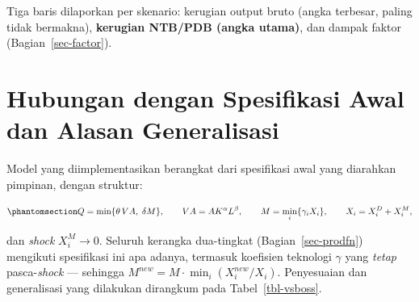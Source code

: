 \documentclass[
  manuscript=article,
  layout=publish,
  year=2026,
  volume=1,
]{den}
\begin{document}
Tiga baris dilaporkan per skenario: kerugian output bruto (angka
terbesar, paling tidak bermakna), \textbf{kerugian NTB/PDB (angka
utama)}, dan dampak faktor (Bagian~\ref{sec-factor}).

\section{Hubungan dengan Spesifikasi Awal dan Alasan
Generalisasi}\label{sec-boss}

Model yang diimplementasikan berangkat dari spesifikasi awal yang
diarahkan pimpinan, dengan struktur:

\begin{equation}\phantomsection\label{eq-bossspec}{
Q = \min\{\theta\,VA,\; \delta M\}, \qquad
VA = AK^{\alpha}L^{\beta}, \qquad
M = \min_i\{\gamma_i X_i\}, \qquad
X_i = X_i^D + X_i^M,
}\end{equation}

dan \emph{shock} \(X_i^M \to 0\). Seluruh kerangka dua-tingkat
(Bagian~\ref{sec-prodfn}) mengikuti spesifikasi ini apa adanya, termasuk
koefisien teknologi \(\gamma\) yang \emph{tetap} pasca-\emph{shock} ---
sehingga \(M^{new} = M \cdot \min_i (X_i^{new}/X_i)\). Penyesuaian dan
generalisasi yang dilakukan dirangkum pada Tabel~\ref{tbl-vsboss}.
\end{document}
